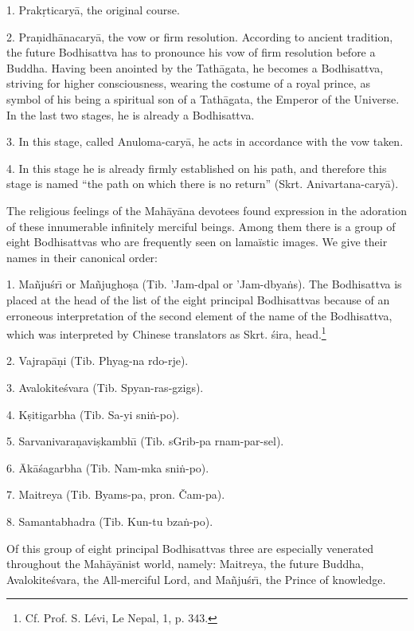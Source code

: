 \documentclass[a4paper, 12pt, oneside]{article}
\begin{document}
1. Prak\d{r}ticary\={a}, the original course.

2. Pra\d{n}idh\={a}nacary\={a}, the vow or firm resolution. According to ancient tradition, the future Bodhisattva has to pronounce his vow of firm resolution before a Buddha. Having been anointed by the Tath\={a}gata, he becomes a Bodhisattva, striving for higher consciousness, wearing the costume of a royal prince, as symbol of his being a spiritual son of a Tath\={a}gata, the Emperor of the Universe. In the last two stages, he is already a Bodhisattva.

3. In this stage, called Anuloma-cary\={a}, he acts in accordance with the vow taken.

4. In this stage he is already firmly established on his path, and therefore this stage is named ``the path on which there is no return'' (Skrt. Anivartana-cary\={a}).

The religious feelings of the Mah\={a}y\={a}na devotees found expression in the adoration of these innumerable infinitely merciful beings. Among them there is a group of eight Bodhisattvas who are frequently seen on lamaïstic images. We give their names in their canonical order:

1. Ma\~{n}ju\'{s}r\={\i} or Ma\~{n}jugho\d{s}a (Tib. 'Jam-dpal or 'Jam-dbya\.{n}s). The Bodhisattva is placed at the head of the list of the eight principal Bodhisattvas because of an erroneous interpretation of the second element of the name of the Bodhisattva, which was interpreted by Chinese translators as Skrt. \'{s}ira, head.\footnote{Cf. Prof. S. Lévi, Le Nepal, 1, p. 343.}

2. Vajrap\={a}\d{n}i (Tib. Phyag-na rdo-rje).

3. Avalokite\'{s}vara (Tib. Spyan-ras-gzigs).

4. K\d{s}itigarbha (Tib. Sa-yi sni\.{n}-po).

5. Sarvanivara\d{n}avi\d{s}kambh\={\i} (Tib. sGrib-pa rnam-par-sel).

6. \={A}k\={a}\'{s}agarbha (Tib. Nam-mka sni\.{n}-po).

7. Maitreya (Tib. Byams-pa, pron. Čam-pa).

8. Samantabhadra (Tib. Kun-tu bza\.{n}-po).

Of this group of eight principal Bodhisattvas three are especially venerated throughout the Mah\={a}y\={a}nist world, namely: Maitreya, the future Buddha, Avalokite\'{s}vara, the All-merciful Lord, and Ma\~{n}ju\'{s}r\={\i}, the Prince of knowledge.
\end{document}
